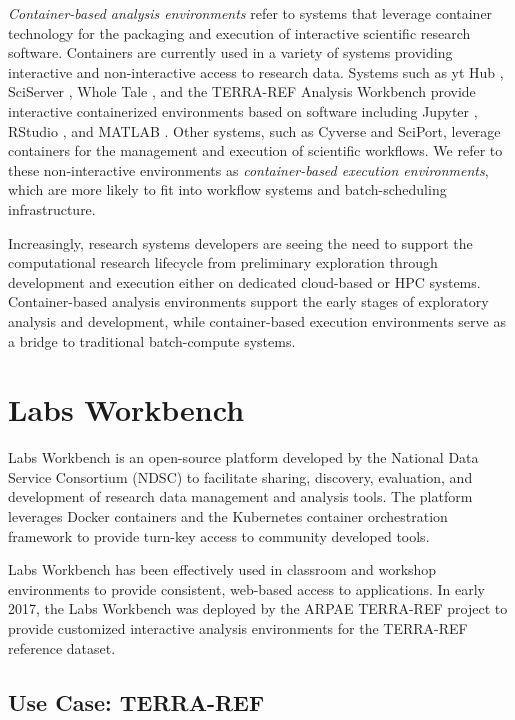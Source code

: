\documentclass{sig-alternate}
\begin{document}
\emph{Container-based analysis environments} refer 	to systems that leverage container technology for the packaging and execution of interactive scientific research software. Containers are currently used in a variety of systems providing interactive and non-interactive access to research data. Systems such as yt Hub \cite{zuhone2016galaxy}, SciServer \cite{Medvedev:2016:SCB:2949689.2949700}, Whole Tale \cite{ludaescher2016capturing}, and the TERRA-REF Analysis Workbench \cite{willis_craig_2017_580057} provide interactive containerized environments based on software including Jupyter \cite{kluyver2016jupyter}, RStudio \cite{Rstudio2015}, and MATLAB \cite{mathworks}. Other systems, such as Cyverse\cite{devisetty2016bringing} and SciPort\cite{Gerlach:2014:SCE:2689676.2689680}, leverage containers for the management and execution of scientific workflows. We refer to these non-interactive environments as \emph{container-based execution environments}, which are more likely to fit into workflow systems and batch-scheduling infrastructure.  

Increasingly, research systems developers are seeing the need to support the computational research lifecycle from preliminary exploration through development and execution either on dedicated cloud-based or HPC systems. Container-based analysis environments support the early stages of exploratory analysis and development, while container-based execution environments serve as a bridge to traditional batch-compute systems.

\section{Labs Workbench}

Labs Workbench is an open-source platform developed by the National Data Service Consortium (NDSC) to facilitate sharing, discovery, evaluation, and development of research data management and analysis tools. The platform leverages Docker containers and the Kubernetes container orchestration framework to provide turn-key access to community developed tools. 

Labs Workbench has been effectively used in classroom and workshop environments to provide consistent, web-based access to applications. In early 2017, the Labs Workbench was deployed by the ARPAE TERRA-REF project to provide customized interactive analysis environments for the TERRA-REF reference dataset. 

\subsection{Use Case: TERRA-REF}
\end{document}
